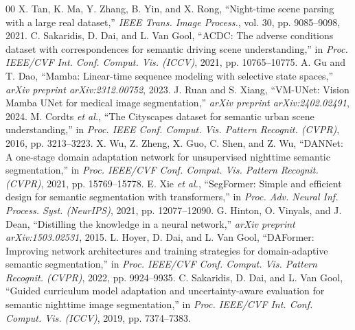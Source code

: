 \documentclass[conference]{IEEEtran}
\begin{document}
\begin{thebibliography}{00}
 X. Tan, K. Ma, Y. Zhang, B. Yin, and X. Rong, ``Night-time scene parsing with a large real dataset,'' \emph{IEEE Trans. Image Process.}, vol. 30, pp. 9085--9098, 2021.
 C. Sakaridis, D. Dai, and L. Van Gool, ``ACDC: The adverse conditions dataset with correspondences for semantic driving scene understanding,'' in \emph{Proc. IEEE/CVF Int. Conf. Comput. Vis. (ICCV)}, 2021, pp. 10765--10775.
 A. Gu and T. Dao, ``Mamba: Linear-time sequence modeling with selective state spaces,'' \emph{arXiv preprint arXiv:2312.00752}, 2023.
 J. Ruan and S. Xiang, ``VM-UNet: Vision Mamba UNet for medical image segmentation,'' \emph{arXiv preprint arXiv:2402.02491}, 2024.
 M. Cordts \emph{et al.}, ``The Cityscapes dataset for semantic urban scene understanding,'' in \emph{Proc. IEEE Conf. Comput. Vis. Pattern Recognit. (CVPR)}, 2016, pp. 3213--3223.
 X. Wu, Z. Zheng, X. Guo, C. Shen, and Z. Wu, ``DANNet: A one-stage domain adaptation network for unsupervised nighttime semantic segmentation,'' in \emph{Proc. IEEE/CVF Conf. Comput. Vis. Pattern Recognit. (CVPR)}, 2021, pp. 15769--15778.
 E. Xie \emph{et al.}, ``SegFormer: Simple and efficient design for semantic segmentation with transformers,'' in \emph{Proc. Adv. Neural Inf. Process. Syst. (NeurIPS)}, 2021, pp. 12077--12090.
 G. Hinton, O. Vinyals, and J. Dean, ``Distilling the knowledge in a neural network,'' \emph{arXiv preprint arXiv:1503.02531}, 2015.
 L. Hoyer, D. Dai, and L. Van Gool, ``DAFormer: Improving network architectures and training strategies for domain-adaptive semantic segmentation,'' in \emph{Proc. IEEE/CVF Conf. Comput. Vis. Pattern Recognit. (CVPR)}, 2022, pp. 9924--9935.
 C. Sakaridis, D. Dai, and L. Van Gool, ``Guided curriculum model adaptation and uncertainty-aware evaluation for semantic nighttime image segmentation,'' in \emph{Proc. IEEE/CVF Int. Conf. Comput. Vis. (ICCV)}, 2019, pp. 7374--7383.
\end{thebibliography}
\end{document}

